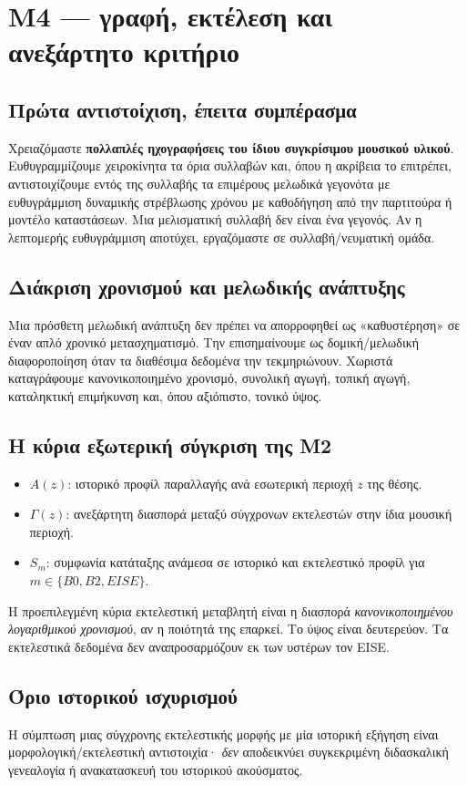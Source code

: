 \documentclass[11pt,a4paper]{extarticle}
\begin{document}
\section{M4 — γραφή, εκτέλεση και ανεξάρτητο κριτήριο}
\subsection*{Πρώτα αντιστοίχιση, έπειτα συμπέρασμα}
Χρειαζόμαστε \textbf{πολλαπλές ηχογραφήσεις του ίδιου συγκρίσιμου μουσικού υλικού}. Ευθυγραμμίζουμε χειροκίνητα τα όρια συλλαβών και, όπου η ακρίβεια το επιτρέπει, αντιστοιχίζουμε εντός της συλλαβής τα επιμέρους μελωδικά γεγονότα με ευθυγράμμιση δυναμικής στρέβλωσης χρόνου με καθοδήγηση από την παρτιτούρα ή μοντέλο καταστάσεων. Μια μελισματική συλλαβή δεν είναι ένα γεγονός. Αν η λεπτομερής ευθυγράμμιση αποτύχει, εργαζόμαστε σε συλλαβή/νευματική ομάδα.
\subsection*{Διάκριση χρονισμού και μελωδικής ανάπτυξης}
Μια πρόσθετη μελωδική ανάπτυξη δεν πρέπει να απορροφηθεί ως «καθυστέρηση» σε έναν απλό χρονικό μετασχηματισμό. Την επισημαίνουμε ως δομική/μελωδική διαφοροποίηση όταν τα διαθέσιμα δεδομένα την τεκμηριώνουν. Χωριστά καταγράφουμε κανονικοποιημένο χρονισμό, συνολική αγωγή, τοπική αγωγή, καταληκτική επιμήκυνση και, όπου αξιόπιστο, τονικό ύψος.
\subsection*{Η κύρια εξωτερική σύγκριση της M2}
\begin{itemize}
\item \(A(z)\): ιστορικό προφίλ παραλλαγής ανά εσωτερική περιοχή \(z\) της θέσης.
\item \(\Gamma(z)\): ανεξάρτητη διασπορά μεταξύ σύγχρονων εκτελεστών στην ίδια μουσική περιοχή.
\item \(S_m\): συμφωνία κατάταξης ανάμεσα σε ιστορικό και εκτελεστικό προφίλ για \(m\in\{B0,B2,EISE\}\).
\end{itemize}
Η προεπιλεγμένη κύρια εκτελεστική μεταβλητή είναι η διασπορά \emph{κανονικοποιημένου λογαριθμικού χρονισμού}, αν η ποιότητά της επαρκεί. Το ύψος είναι δευτερεύον. Τα εκτελεστικά δεδομένα δεν αναπροσαρμόζουν εκ των υστέρων τον EISE.
\subsection*{Όριο ιστορικού ισχυρισμού}
Η σύμπτωση μιας σύγχρονης εκτελεστικής μορφής με μία ιστορική εξήγηση είναι μορφολογική/εκτελεστική αντιστοιχία· \emph{δεν} αποδεικνύει συγκεκριμένη διδασκαλική γενεαλογία ή ανακατασκευή του ιστορικού ακούσματος.
\end{document}
